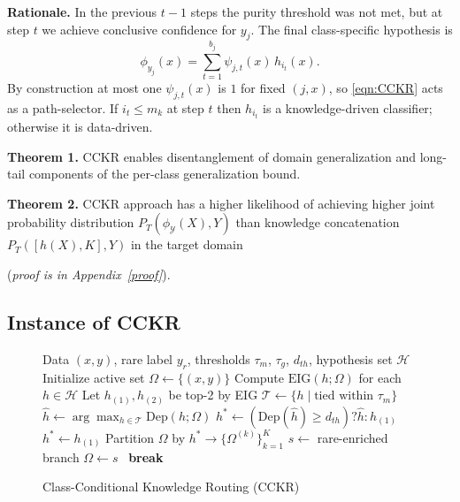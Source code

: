 \documentclass{article}
\begin{document}
\textbf{Rationale.} In the previous $t-1$ steps the purity threshold was not
met, but at step $t$ we achieve conclusive confidence for $y_j$. The final
class-specific hypothesis is
\begin{equation}
\label{eqn:CCKR}
\phi_{y_j}(x) = \sum_{t=1}^{b_j} \psi_{j,t}(x)\, h_{i_t}(x).
\end{equation}
By construction at most one $\psi_{j,t}(x)$ is $1$ for fixed $(j, x)$, so
\eqref{eqn:CCKR} acts as a path-selector. If $i_t \le m_k$ at step $t$ then
$h_{i_t}$ is a knowledge-driven classifier; otherwise it is data-driven.


\noindent\textbf{Theorem 1.}
CCKR enables disentanglement of domain generalization and long-tail components of the per-class generalization bound.


\noindent\textbf{Theorem 2.}
CCKR approach has a higher likelihood of achieving higher joint probability distribution
$P_T(\phi_{\mathcal{Y}}(X),Y)$ than knowledge concatenation $P_T([h(X),K],Y)$ in the target domain

(\emph{proof is in Appendix~\ref{proof}}).
\subsection{Instance of CCKR}
\label{sec:CCKR_instance}
\begin{figure} %
\vspace{-32pt} 
\begin{minipage}{0.5\textwidth}

\begin{algorithm}[H] %

\small
\caption{Class-Conditional Knowledge Routing (CCKR)}
\label{alg:CCKR}
\begin{algorithmic}[1]
\Require Data $(x, y)$, rare label $y_r$, thresholds $\tau_m$, $\tau_g$, $d_{th}$, hypothesis set $\mathcal{H}$
\State Initialize active set $\Omega \leftarrow \{(x, y)\}$
    \State Compute $\mathrm{EIG}(h; \Omega)$ for each $h \in \mathcal{H}$
    \State Let $h_{(1)}, h_{(2)}$ be top-2 by EIG
        \State $\mathcal{T} \leftarrow \{h \mid \text{tied within } \tau_m\}$
        \State $\hat{h} \leftarrow \arg\max_{h \in \mathcal{T}} \mathrm{Dep}(h; \Omega)$
        \State $h^* \leftarrow (\mathrm{Dep}(\hat{h}) \ge d_{th}) ? \hat{h} : h_{(1)}$
    \Else
        \State $h^* \leftarrow h_{(1)}$
    \EndIf
    \State Partition $\Omega$ by $h^* \rightarrow \{ \Omega^{(k)} \}_{k=1}^K$
    \State $s \leftarrow$ rare-enriched branch
        \State $\Omega \leftarrow s$
    \Else \ \textbf{break}
    \EndIf
\EndWhile
\end{algorithmic}
\end{algorithm}
\end{minipage}
\vspace{-35pt}
\end{figure}        
\end{document}
